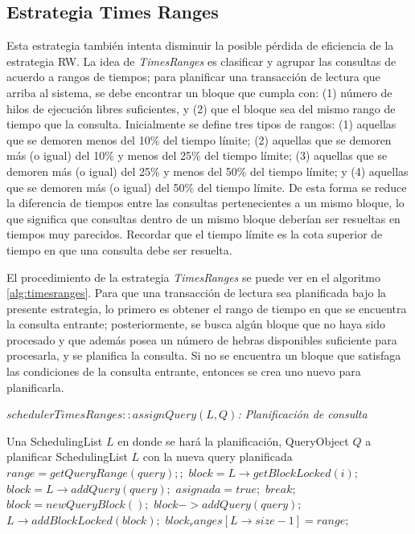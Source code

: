 \subsection{Estrategia Times Ranges}
\label{scheduling:timesranges}
Esta estrategia también intenta disminuir la posible pérdida de eficiencia de la estrategia RW. La idea de \textit{TimesRanges} es clasificar y agrupar las consultas de acuerdo a rangos de tiempos; para planificar una transacción de lectura que arriba al sistema, se debe encontrar un bloque que cumpla con: (1) número de hilos de ejecución libres suficientes, y (2) que el bloque sea del mismo rango de tiempo que la consulta. Inicialmente se define tres tipos de rangos: (1) aquellas que se demoren menos del 10\% del tiempo límite; (2) aquellas que se demoren más (o igual) del 10\% y menos del 25\% del tiempo límite; (3) aquellas que se demoren más (o igual) del 25\% y menos del 50\% del tiempo límite; y (4) aquellas que se demoren más (o igual) del 50\% del tiempo límite. De esta forma se reduce la diferencia de tiempos entre las consultas pertenecientes a un mismo bloque, lo que significa que consultas dentro de un mismo bloque deberían ser resueltas en tiempos muy parecidos. Recordar que el tiempo límite es la cota superior de tiempo en que una consulta debe ser resuelta.

El procedimiento de la estrategia \textit{TimesRanges} se puede ver en el algoritmo \ref{alg:timesranges}. Para que una transacción de lectura sea planificada bajo la presente estrategia, lo primero es obtener el rango de tiempo en que se encuentra la consulta entrante; posteriormente, se busca algún bloque que no haya sido procesado y que además posea un número de hebras disponibles suficiente para procesarla, y se planifica la consulta. Si no se encuentra un bloque que satisfaga las condiciones de la consulta entrante, entonces se crea uno nuevo para planificarla. 

\begin{algorithm}[!th]
\caption{\em $schedulerTimesRanges::assignQuery(L, Q)$: Planificación de consulta}
\label{alg:timesranges}
\begin{algorithmic}[1]
\REQUIRE Una SchedulingList $L$ en donde se hará la planificación, QueryObject $Q$ a planificar
\ENSURE SchedulingList $L$ con la nueva query planificada	
	\STATE $range = getQueryRange(query);;$		
		\STATE $block = L \rightarrow getBlockLocked(i);$	
			\STATE $block = L \rightarrow addQuery(query);$
			\STATE $asignada = true;$
			\STATE $break;$	
		\ENDIF
	\ENDFOR
		\STATE $block = new QueryBlock();$	
		\STATE $block->addQuery(query);$	
		\STATE $L \rightarrow addBlockLocked(block);$
		\STATE $block_ranges[L \rightarrow size - 1] = range;$	
	\ENDIF
\end{algorithmic}
\end{algorithm}


